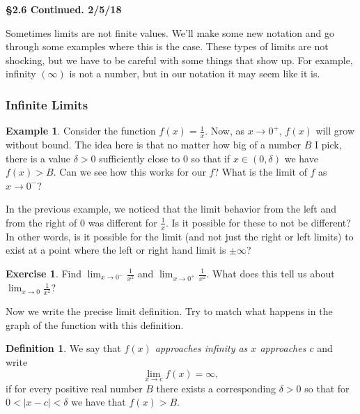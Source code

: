 \documentclass[leqno]{article}
\theoremstyle{definition}
\newtheorem{definition}{Definition}[section]
\newtheorem{example}{Example}[section]
\newtheorem{exercise}{Exercise}[section]
\theoremstyle{remark}
\theoremstyle{theorem}
\begin{document}
\noindent \textbf{\Large{\S 2.6 Continued.  2/5/18}}

Sometimes limits are not finite values.  We'll make some new notation and go through some examples where this is the case.  These types of limits are not shocking, but we have to be careful with some things that show up.  For example, infinity $(\infty)$ is not a number, but in our notation it may seem like it is.

\subsubsection{Infinite Limits}

\begin{example}
Consider the function $f(x)=\frac{1}{x}$.  Now, as $x\to 0^+$, $f(x)$ will grow without bound. The idea here is that no matter how big of a number $B$ I pick, there is a value $\delta>0$ sufficiently close to $0$ so that if $x\in (0,\delta)$ we have $f(x)>B$.  Can we see how this works for our $f$?
\vspace*{4cm}  
What is the limit of $f$ as $x\to 0^-$?
\vspace*{2cm}
\end{example}

In the previous example, we noticed that the limit behavior from the left and from the right of $0$ was different for $\frac{1}{x}$.  Is it possible for these to not be different?  In other words, is it possible for the limit (and not just the right or left limits) to exist at a point where the left or right hand limit is $\pm \infty$?

\begin{exercise}
Find $\lim_{x\to 0^-} \frac{1}{x^2}$ and $\lim_{x\to 0^+}\frac{1}{x^2}$.  
\vspace*{5cm}
What does this tell us about $\lim_{x\to 0} \frac{1}{x^2}$?
\vspace*{2cm}
\end{exercise}

Now we write the precise limit definition.  Try to match what happens in the graph of the function with this definition.  

\begin{definition}
We say that \emph{$f(x)$ approaches infinity as $x$ approaches $c$} and write 
\[
\lim_{x\to c} f(x) = \infty,
\]
if for every positive real number $B$ there exists a corresponding $\delta>0$ so that for $0<|x-c|<\delta$ we have that $f(x)>B$.
\end{definition}
\end{document}
